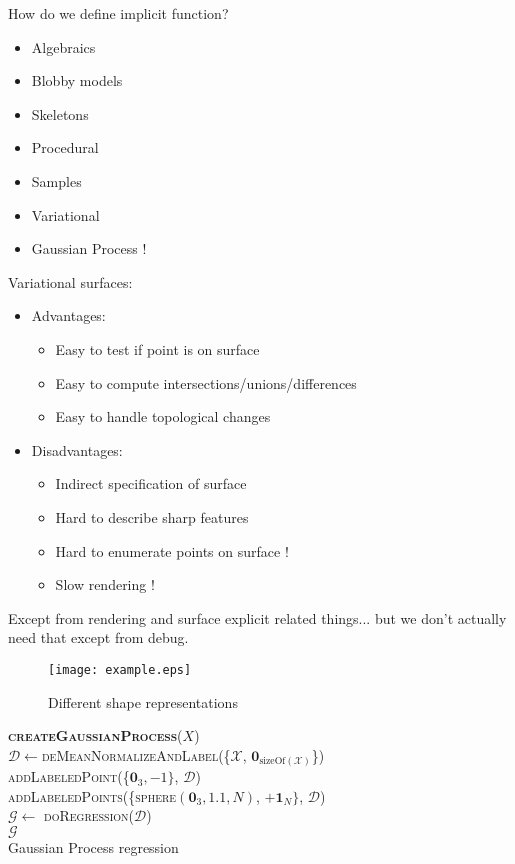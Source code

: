 How do we define implicit function?
\begin{itemize}
\item Algebraics
\item Blobby models
\item Skeletons
\item Procedural
\item Samples
\item Variational
\item Gaussian Process !
\end{itemize}

Variational surfaces:
\begin{itemize}
\item Advantages:
\begin{itemize} 
\item Easy to test if point is on surface
\item Easy to compute intersections/unions/differences
\item Easy to handle topological changes
\end{itemize}
\item Disadvantages:
\begin{itemize}
\item Indirect specification of surface
\item Hard to describe sharp features
\item Hard to enumerate points on surface !
\item Slow rendering !
\end{itemize}
\end{itemize}

Except from rendering and surface explicit related things... but we don't actually need that except from debug.

\begin{figure}
\centering
  \texttt{[image: example.eps]}
  \caption{Different shape representations} \label{fig:shape-comparison}
\end{figure}

\begin{algorithm}[h]
\textbf{\textsc{createGaussianProcess}}($X$)\\ %
\LinesNumbered
\DontPrintSemicolon
\SetAlgoVlined {} 
  $\mathcal{D} \leftarrow$\textsc{deMeanNormalizeAndLabel}(\{$\mathcal{X}$, $\mathbf{0}_{\text{sizeOf}(\mathcal{X})}$\}) \\
  \textsc{addLabeledPoint}(\{$\mathbf{0}_3, -1\}$, $\mathcal{D}$) \\
  \textsc{addLabeledPoints}(\{\textsc{sphere}$(\mathbf{0}_3, 1.1, N)$, $+\mathbf{1}_{N}\}$, $\mathcal{D}$) \\
  $\mathcal{G} \leftarrow$ \textsc{doRegression}($\mathcal{D}$) \\
  \Return $\mathcal{G}$ \\
\caption{Gaussian Process regression} \label{algo:strategy}
\end{algorithm}

